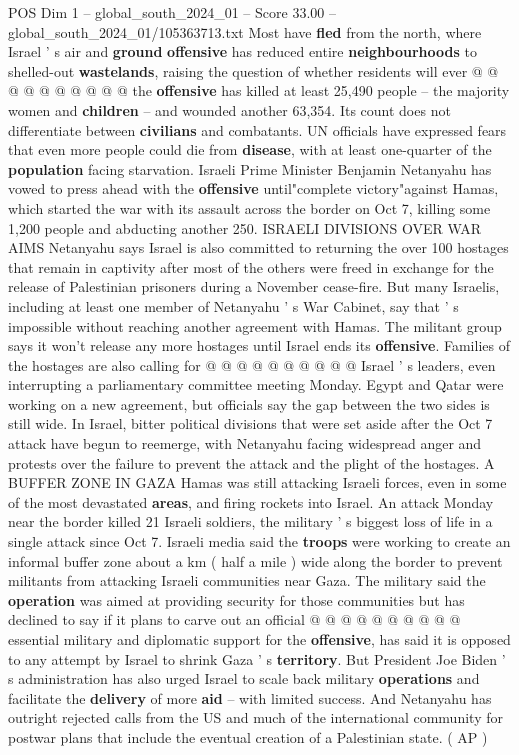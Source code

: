 \begin{textsample}{POS Dim 1 – global\_south\_2024\_01 – Score 33.00 – global\_south\_2024\_01/105363713.txt}
Most have \textbf{fled} from the north, where Israel ' s air and \textbf{ground} \textbf{offensive} has reduced entire \textbf{neighbourhoods} to shelled-out \textbf{wastelands}, raising the question of whether residents will ever @ @ @ @ @ @ @ @ @ @ the \textbf{offensive} has killed at least 25,490 people -- the majority women and \textbf{children} -- and wounded another 63,354.
Its count does not differentiate between \textbf{civilians} and combatants.
UN officials have expressed fears that even more people could die from \textbf{disease}, with at least one-quarter of the \textbf{population} facing starvation.
Israeli Prime Minister Benjamin Netanyahu has vowed to press ahead with the \textbf{offensive} until"complete victory"against Hamas, which started the war with its assault across the border on Oct 7, killing some 1,200 people and abducting another 250.
ISRAELI DIVISIONS OVER WAR AIMS Netanyahu says Israel is also committed to returning the over 100 hostages that remain in captivity after most of the others were freed in exchange for the release of Palestinian prisoners during a November cease-fire.
But many Israelis, including at least one member of Netanyahu ' s War Cabinet, say that ' s impossible without reaching another agreement with Hamas.
The militant group says it won't release any more hostages until Israel ends its \textbf{offensive}.
Families of the hostages are also calling for @ @ @ @ @ @ @ @ @ @ Israel ' s leaders, even interrupting a parliamentary committee meeting Monday.
Egypt and Qatar were working on a new agreement, but officials say the gap between the two sides is still wide.
In Israel, bitter political divisions that were set aside after the Oct 7 attack have begun to reemerge, with Netanyahu facing widespread anger and protests over the failure to prevent the attack and the plight of the hostages.
A BUFFER ZONE IN GAZA Hamas was still attacking Israeli forces, even in some of the most devastated \textbf{areas}, and firing rockets into Israel.
An attack Monday near the border killed 21 Israeli soldiers, the military ' s biggest loss of life in a single attack since Oct 7.
Israeli media said the \textbf{troops} were working to create an informal buffer zone about a km ( half a mile ) wide along the border to prevent militants from attacking Israeli communities near Gaza.
The military said the \textbf{operation} was aimed at providing security for those communities but has declined to say if it plans to carve out an official @ @ @ @ @ @ @ @ @ @ essential military and diplomatic support for the \textbf{offensive}, has said it is opposed to any attempt by Israel to shrink Gaza ' s \textbf{territory}.
But President Joe Biden ' s administration has also urged Israel to scale back military \textbf{operations} and facilitate the \textbf{delivery} of more \textbf{aid} -- with limited success.
And Netanyahu has outright rejected calls from the US and much of the international community for postwar plans that include the eventual creation of a Palestinian state. ( AP )


\end{textsample}
